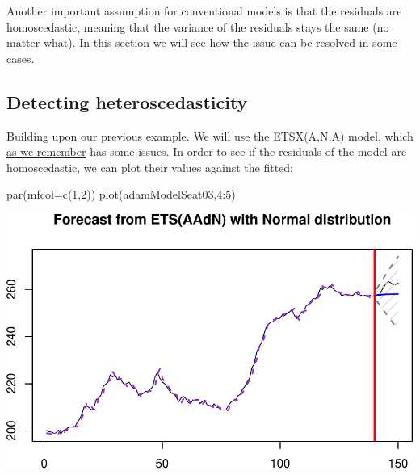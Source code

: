 \documentclass[
]{book}
\newenvironment{Shaded}{\begin{snugshade}}{\end{snugshade}}
\newcommand{\AttributeTok}[1]{\textcolor[rgb]{0.77,0.63,0.00}{#1}}
\newcommand{\DecValTok}[1]{\textcolor[rgb]{0.00,0.00,0.81}{#1}}
\newcommand{\FunctionTok}[1]{\textcolor[rgb]{0.00,0.00,0.00}{#1}}
\newcommand{\NormalTok}[1]{#1}
\newcommand{\SpecialCharTok}[1]{\textcolor[rgb]{0.00,0.00,0.00}{#1}}
\theoremstyle{definition}
\theoremstyle{definition}
\theoremstyle{definition}
\theoremstyle{definition}
\theoremstyle{remark}
\begin{document}
Another important assumption for conventional models is that the residuals are homoscedastic, meaning that the variance of the residuals stays the same (no matter what). In this section we will see how the issue can be resolved in some cases.

\hypertarget{detecting-heteroscedasticity}{%
\subsection{Detecting heteroscedasticity}\label{detecting-heteroscedasticity}}

Building upon our previous example. We will use the ETSX(A,N,A) model, which \protect\hyperlink{diagnosticsTransformations}{as we remember} has some issues. In order to see if the residuals of the model are homoscedastic, we can plot their values against the fitted:

\begin{Shaded}
\begin{Highlighting}[]
\FunctionTok{par}\NormalTok{(}\AttributeTok{mfcol=}\FunctionTok{c}\NormalTok{(}\DecValTok{1}\NormalTok{,}\DecValTok{2}\NormalTok{))}
\FunctionTok{plot}\NormalTok{(adamModelSeat03,}\DecValTok{4}\SpecialCharTok{:}\DecValTok{5}\NormalTok{)}
\end{Highlighting}
\end{Shaded}

\includegraphics{adam_files/figure-latex/unnamed-chunk-161-1.pdf}
\end{document}
